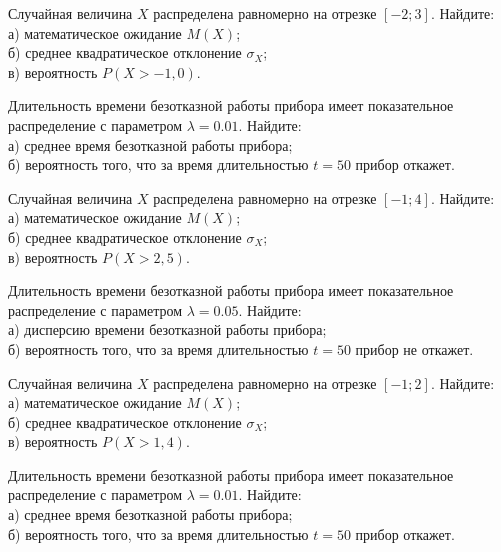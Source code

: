 \vfill

\newpage\setcounter{zad}{0}

\z Случайная величина $X$ распределена равномерно на отрезке $[-2; 3]$. Найдите: \\ \quad а) математическое ожидание $M(X)$; \\ \quad б) среднее квадратическое отклонение $\sigma_X$; \\ \quad в) вероятность $P(X>-1{,}0)$.


\vfill

\z Длительность времени безотказной работы прибора имеет показательное распределение с параметром $\lambda = 0.01$. Найдите: \\ \quad а) среднее время безотказной работы прибора; \\ \quad б) вероятность того, что за время длительностью $t = 50$ прибор откажет.
 

\vfill

\newpage\setcounter{zad}{0}

\z Случайная величина $X$ распределена равномерно на отрезке $[-1; 4]$. Найдите: \\ \quad а) математическое ожидание $M(X)$; \\ \quad б) среднее квадратическое отклонение $\sigma_X$; \\ \quad в) вероятность $P(X>2{,}5)$.


\vfill

\z Длительность времени безотказной работы прибора имеет показательное распределение с параметром $\lambda = 0.05$. Найдите: \\ \quad а) дисперсию времени безотказной работы прибора; \\ \quad б) вероятность того, что за время длительностью $t = 50$ прибор не откажет.
 

\vfill

\newpage\setcounter{zad}{0}

\z Случайная величина $X$ распределена равномерно на отрезке $[-1; 2]$. Найдите: \\ \quad а) математическое ожидание $M(X)$; \\ \quad б) среднее квадратическое отклонение $\sigma_X$; \\ \quad в) вероятность $P(X>1{,}4)$.


\vfill

\z Длительность времени безотказной работы прибора имеет показательное распределение с параметром $\lambda = 0.01$. Найдите: \\ \quad а) среднее время безотказной работы прибора; \\ \quad б) вероятность того, что за время длительностью $t = 50$ прибор откажет.
 

